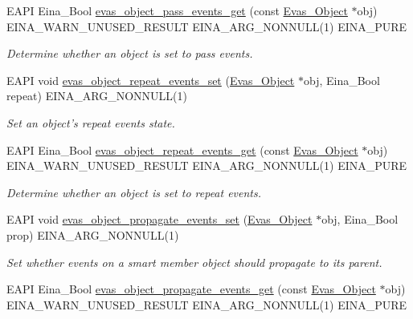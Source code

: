 \begin{DoxyCompactItemize}
EAPI Eina\_\-Bool \hyperlink{group__Evas__Object__Group__Events_ga019458a8697c55dc3d5e3fe525c535e0}{evas\_\-object\_\-pass\_\-events\_\-get} (const \hyperlink{group__Evas__Object__Group_ga9e19e6dd1f517a0ba437c0114d3e7c97}{Evas\_\-Object} $\ast$obj) EINA\_\-WARN\_\-UNUSED\_\-RESULT EINA\_\-ARG\_\-NONNULL(1) EINA\_\-PURE
\begin{DoxyCompactList}\small\item\em Determine whether an object is set to pass events. \item\end{DoxyCompactList}\item 
EAPI void \hyperlink{group__Evas__Object__Group__Events_gaacd5e00427f3c98ecfb72f630ff7aa46}{evas\_\-object\_\-repeat\_\-events\_\-set} (\hyperlink{group__Evas__Object__Group_ga9e19e6dd1f517a0ba437c0114d3e7c97}{Evas\_\-Object} $\ast$obj, Eina\_\-Bool repeat) EINA\_\-ARG\_\-NONNULL(1)
\begin{DoxyCompactList}\small\item\em Set an object's repeat events state. \item\end{DoxyCompactList}\item 
EAPI Eina\_\-Bool \hyperlink{group__Evas__Object__Group__Events_ga2c7ca0c2c33ec1e12da64f60a5742582}{evas\_\-object\_\-repeat\_\-events\_\-get} (const \hyperlink{group__Evas__Object__Group_ga9e19e6dd1f517a0ba437c0114d3e7c97}{Evas\_\-Object} $\ast$obj) EINA\_\-WARN\_\-UNUSED\_\-RESULT EINA\_\-ARG\_\-NONNULL(1) EINA\_\-PURE
\begin{DoxyCompactList}\small\item\em Determine whether an object is set to repeat events. \item\end{DoxyCompactList}\item 
EAPI void \hyperlink{group__Evas__Object__Group__Events_gaca523e82bd3e590f92e8bbda29c1607d}{evas\_\-object\_\-propagate\_\-events\_\-set} (\hyperlink{group__Evas__Object__Group_ga9e19e6dd1f517a0ba437c0114d3e7c97}{Evas\_\-Object} $\ast$obj, Eina\_\-Bool prop) EINA\_\-ARG\_\-NONNULL(1)
\begin{DoxyCompactList}\small\item\em Set whether events on a smart member object should propagate to its parent. \item\end{DoxyCompactList}\item 
EAPI Eina\_\-Bool \hyperlink{group__Evas__Object__Group__Events_gadc40db6c861c8e57a2229783f0e9ac7f}{evas\_\-object\_\-propagate\_\-events\_\-get} (const \hyperlink{group__Evas__Object__Group_ga9e19e6dd1f517a0ba437c0114d3e7c97}{Evas\_\-Object} $\ast$obj) EINA\_\-WARN\_\-UNUSED\_\-RESULT EINA\_\-ARG\_\-NONNULL(1) EINA\_\-PURE

\end{DoxyCompactItemize}
